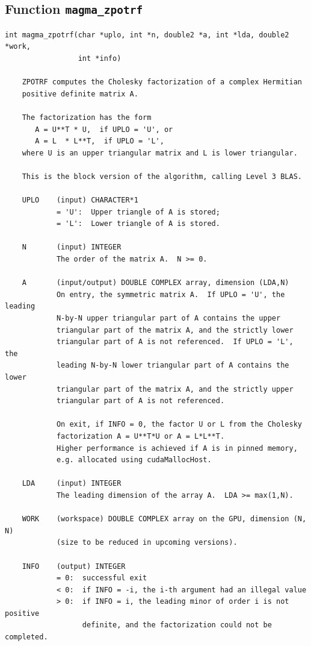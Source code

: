 \documentclass[10pt]{book}
\begin{document}
\subsection{Function {\tt {\bf magma\_zpotrf}}}
\begin{verbatim}
int magma_zpotrf(char *uplo, int *n, double2 *a, int *lda, double2 *work, 
                 int *info)
   
    ZPOTRF computes the Cholesky factorization of a complex Hermitian   
    positive definite matrix A.   

    The factorization has the form   
       A = U**T * U,  if UPLO = 'U', or   
       A = L  * L**T,  if UPLO = 'L',   
    where U is an upper triangular matrix and L is lower triangular.   

    This is the block version of the algorithm, calling Level 3 BLAS.   

    UPLO    (input) CHARACTER*1   
            = 'U':  Upper triangle of A is stored;   
            = 'L':  Lower triangle of A is stored.   

    N       (input) INTEGER   
            The order of the matrix A.  N >= 0.   

    A       (input/output) DOUBLE COMPLEX array, dimension (LDA,N)   
            On entry, the symmetric matrix A.  If UPLO = 'U', the leading   
            N-by-N upper triangular part of A contains the upper   
            triangular part of the matrix A, and the strictly lower   
            triangular part of A is not referenced.  If UPLO = 'L', the   
            leading N-by-N lower triangular part of A contains the lower   
            triangular part of the matrix A, and the strictly upper   
            triangular part of A is not referenced.   

            On exit, if INFO = 0, the factor U or L from the Cholesky   
            factorization A = U**T*U or A = L*L**T.   
            Higher performance is achieved if A is in pinned memory,
            e.g. allocated using cudaMallocHost.

    LDA     (input) INTEGER   
            The leading dimension of the array A.  LDA >= max(1,N).   

    WORK    (workspace) DOUBLE COMPLEX array on the GPU, dimension (N, N)
            (size to be reduced in upcoming versions).

    INFO    (output) INTEGER   
            = 0:  successful exit   
            < 0:  if INFO = -i, the i-th argument had an illegal value   
            > 0:  if INFO = i, the leading minor of order i is not positive 
                  definite, and the factorization could not be completed.   
\end{verbatim}
\end{document}
